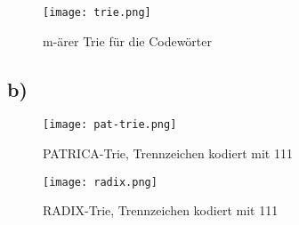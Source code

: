 \documentclass[a4paper]{article}
\begin{document}
\begin{figure}[!h]
	\begin{center}
		\texttt{[image: trie.png]}
	\end{center}
	\caption{m-ärer Trie für die Codewörter}
	\label{fig:trie}
\end{figure}

\clearpage
\subsection*{b)}

\begin{figure}[!h]
	\begin{center}
		\texttt{[image: pat-trie.png]}
	\end{center}
	\caption{PATRICA-Trie, Trennzeichen kodiert mit 111}
	\label{fig:pat-trie}
\end{figure}

\begin{figure}[!h]
	\begin{center}
		\texttt{[image: radix.png]}
	\end{center}
	\caption{RADIX-Trie, Trennzeichen kodiert mit 111}
	\label{fig:pat-trie}
\end{figure}
\end{document}
